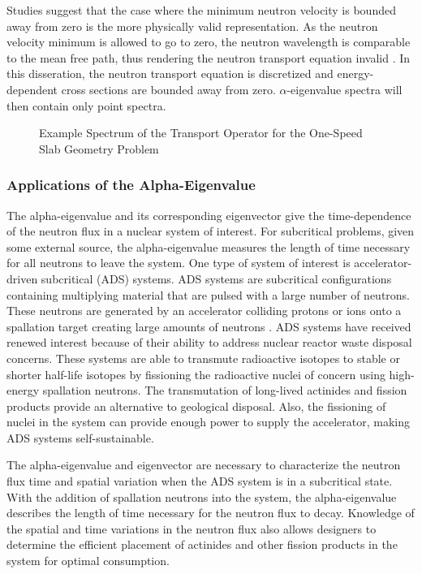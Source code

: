 Studies suggest that the case where the minimum neutron velocity is bounded away from zero is the more physically valid representation. As the neutron velocity minimum is allowed to go to zero, the neutron wavelength is comparable to the mean free path, thus rendering the neutron transport equation invalid \cite{duderstadt_nuclear_1976}. In this disseration, the neutron transport equation is discretized and energy-dependent cross sections are bounded away from zero. $\alpha$-eigenvalue spectra will then contain only point spectra.

\begin{figure}
	\centering
	\resizebox{0.5\textwidth}{!}{

	}
	\caption{Example Spectrum of the Transport Operator for the One-Speed Slab Geometry Problem}
	\label{fig:AlphaEigSpectrum}
\end{figure}

\subsubsection{Applications of the Alpha-Eigenvalue}

The alpha-eigenvalue and its corresponding eigenvector give the time-dependence of the neutron flux in a nuclear system of interest. For subcritical problems, given some external source, the alpha-eigenvalue measures the length of time necessary for all neutrons to leave the system. One type of system of interest is accelerator-driven subcritical (ADS) systems. ADS systems are subcritical configurations containing multiplying material that are pulsed with a large number of neutrons. These neutrons are generated by an accelerator colliding protons or ions onto a spallation target creating large amounts of neutrons \cite{abderrahim2001myrrha}. ADS systems have received renewed interest because of their ability to address nuclear reactor waste disposal concerns. These systems are able to transmute radioactive isotopes to stable or shorter half-life isotopes by fissioning the radioactive nuclei of concern using high-energy spallation neutrons. The transmutation of long-lived actinides and fission products provide an alternative to geological disposal. Also, the fissioning of nuclei in the system can provide enough power to supply the accelerator, making ADS systems self-sustainable.

The alpha-eigenvalue and eigenvector are necessary to characterize the neutron flux time and spatial variation when the ADS system is in a subcritical state. With the addition of spallation neutrons into the system, the alpha-eigenvalue describes the length of time necessary for the neutron flux to decay. Knowledge of the spatial and time variations in the neutron flux also allows designers to determine the efficient placement of actinides and other fission products in the system for optimal consumption.

